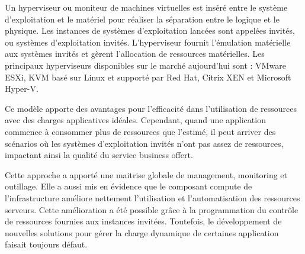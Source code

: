 Un hyperviseur ou moniteur de machines virtuelles est inséré entre le système d'exploitation et le matériel pour réaliser la séparation entre le logique et le physique. Les instances de systèmes d'exploitation lancées sont appelées invités, ou systèmes d'exploitation invités. L'hyperviseur fournit l'émulation matérielle aux systèmes invités et gèrent l'allocation de ressources matérielles.  Les principaux hyperviseurs disponibles sur le marché aujourd'hui sont : VMware ESXi, KVM basé sur Linux et supporté par Red Hat, Citrix XEN et Microsoft Hyper-V. 

Ce modèle apporte des avantages pour l'efficacité dans l'utilisation de ressources avec des charges applicatives idéales.
 Cependant, quand une application commence à consommer plus de ressources que l'estimé, il peut arriver des scénarios où les systèmes d'exploitation invités n'ont pas assez de ressources, impactant ainsi la qualité du service business offert. 

Cette approche a apporté une maitrise globale de management, monitoring et outillage. Elle a aussi mis en évidence que le composant \og compute \fg{} de l'infrastructure améliore nettement l'utilisation et l'automatisation des ressources serveurs. Cette amélioration a été possible grâce à la programmation du contrôle de ressources fournies aux instances invitées. Toutefois, le développement de nouvelles solutions pour gérer la charge dynamique de certaines application faisait toujours défaut. \cite{journeySDDC} \cite{ibmPlanningVirtCCchap2}





